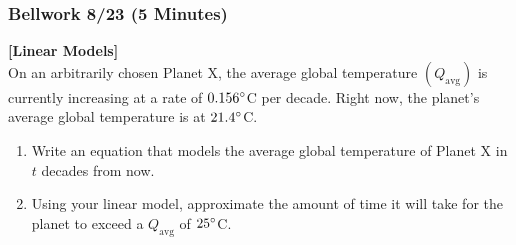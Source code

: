 \documentclass[12pt]{beamer}
\begin{document}
\begin{frame}
	\frametitle{Bellwork 8/23 (5 Minutes)}
	\initclock
	\textbf{[Linear Models]}\vspace{.2cm}\\
	\vspace*{\fill}
	On an arbitrarily chosen Planet X, the average global temperature $(Q_{\text{avg}})$ is currently increasing at a rate of $0.156\degree$C per decade. Right now, the planet's average global temperature is at $21.4\degree$C.
	\vspace*{\fill}
	\begin{enumerate}
		\item Write an equation that models the average global temperature of Planet X in $t$ decades from now.
		      \vspace*{\fill}
		\item Using your linear model, approximate the amount of time it will take for the planet to exceed a $Q_{\text{avg}}$ of $25\degree$C.
	\end{enumerate}
	\vspace*{\fill}
	\vspace*{\fill}
	\crono
\end{frame}
\end{document}

